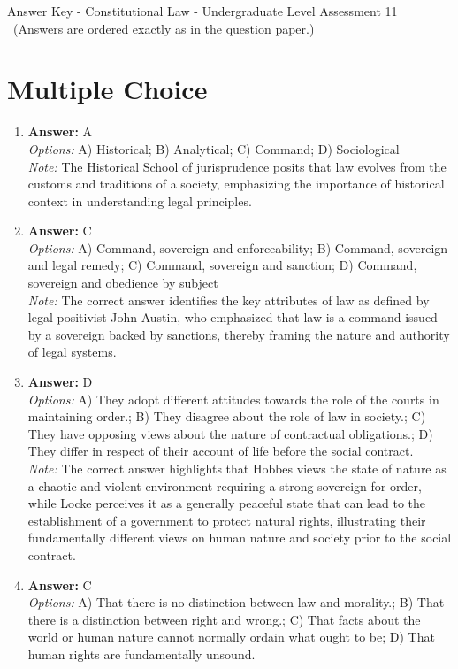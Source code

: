 \documentclass[12pt]{article}
\begin{document}
\begin{center}
Answer Key - Constitutional Law - Undergraduate Level Assessment 11 \
\small (Answers are ordered exactly as in the question paper.)
\end{center}

\section*{Multiple Choice}
\begin{enumerate}[label=\arabic*.]
\item \textbf{Answer:} A
\\ \textit{Options:} A) Historical; B) Analytical; C) Command; D) Sociological
\\ \textit{Note:} The Historical School of jurisprudence posits that law evolves from the customs and traditions of a society, emphasizing the importance of historical context in understanding legal principles.
\item \textbf{Answer:} C
\\ \textit{Options:} A) Command, sovereign and enforceability; B) Command, sovereign and legal remedy; C) Command, sovereign and sanction; D) Command, sovereign and obedience by subject
\\ \textit{Note:} The correct answer identifies the key attributes of law as defined by legal positivist John Austin, who emphasized that law is a command issued by a sovereign backed by sanctions, thereby framing the nature and authority of legal systems.
\item \textbf{Answer:} D
\\ \textit{Options:} A) They adopt different attitudes towards the role of the courts in maintaining order.; B) They disagree about the role of law in society.; C) They have opposing views about the nature of contractual obligations.; D) They differ in respect of their account of life before the social contract.
\\ \textit{Note:} The correct answer highlights that Hobbes views the state of nature as a chaotic and violent environment requiring a strong sovereign for order, while Locke perceives it as a generally peaceful state that can lead to the establishment of a government to protect natural rights, illustrating their fundamentally different views on human nature and society prior to the social contract.
\item \textbf{Answer:} C
\\ \textit{Options:} A) That there is no distinction between law and morality.; B) That there is a distinction between right and wrong.; C) That facts about the world or human nature cannot normally ordain what ought to be; D) That human rights are fundamentally unsound.

\end{enumerate}
\end{document}
